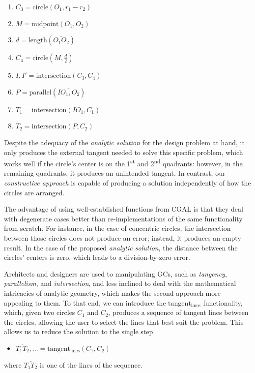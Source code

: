 \begin{enumerate}
  \item $C_3 = \mathrm{circle}\left(O_1, r_1 - r_2\right)$
  \item $M = \mathrm{midpoint}\left(O_1, O_2\right)$
  \item $d = \mathrm{length}\left(\overline{O_1 O_2}\right)$
  \item $C_4 = \mathrm{circle}\left(M, \frac{d}{2}\right)$
  \item $I,I' = \mathrm{intersection}\left(C_3, C_4\right)$
  \item $P = \mathrm{parallel}\left(\overline{IO_1, O_2}\right)$
  \item $T_1 = \mathrm{intersection}\left(IO_1, C_1\right)$
  \item $T_2 = \mathrm{intersection}\left(P, C_2\right)$
\end{enumerate}

Despite the adequacy of the \textit{analytic solution} for the design problem at
hand, it only produces the external tangent needed to solve this specific
problem, which works well if the circle's center is on the 1\textsuperscript{st}
and 2\textsuperscript{nd} quadrants: however, in the remaining quadrants, it
produces an unintended tangent.  In contrast, our \textit{constructive approach}
is capable of producing a solution independently of how the circles are
arranged.

The advantage of using well-established functions from \ac{CGAL} is that they
deal with degenerate cases better than re-implementations of the same
functionality from scratch.  For instance, in the case of concentric circles,
the intersection between those circles does not produce an error; instead, it
produces an empty result.  In the case of the proposed \textit{analytic
solution}, the distance between the circles' centers is zero, which leads to a
division-by-zero error.

Architects and designers are used to manipulating \acp{GC}, such as
\textit{tangency}, \textit{parallelism}, and \textit{intersection}, and less
inclined to deal with the mathematical intricacies of analytic geometry, which
makes the second approach more appealing to them.  To that end, we can introduce
the $\mathrm{tangent_{lines}}$ functionality, which, given two circles $C_1$ and
$C_2$, produces a sequence of tangent lines between the circles, allowing the
user to select the lines that best suit the problem.  This allows us to reduce
the solution to the single step
\begin{itemize}
  \item[] $\overline{T_1 T_2},\ldots = \mathrm{tangent_{lines}}\left(C_1,
  C_2\right)$
\end{itemize}
where $\overline{T_1 T_2}$ is one of the lines of the sequence.

